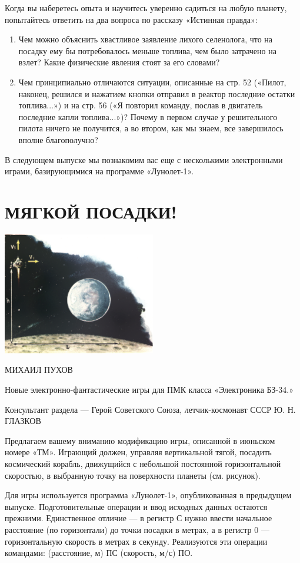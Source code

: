 \documentclass[11pt,a4paper,oneside]{article}
\begin{document}
Когда вы наберетесь опыта и научитесь уверенно садиться на любую планету, попытайтесь ответить на два вопроса по рассказу «Истинная правда»:
\begin{enumerate}
\item Чем можно объяснить хвастливое заявление лихого селенолога, что на посадку ему бы потребовалось меньше топлива, чем было затрачено на взлет? Какие физические явления стоят за его словами?
\item Чем принципиально отличаются ситуации, описанные на стр. 52 («Пилот, наконец, решился и нажатием кнопки отправил в реактор последние остатки топлива...») и на стр. 56 («Я повторил команду, послав в двигатель последние капли топлива...»)? Почему в первом случае у решительного пилота ничего не получится, а во втором, как мы знаем, все завершилось вполне благополучно?
\end{enumerate}

В следующем выпуске мы познакомим вас еще с несколькими электронными играми, базирующимися на программе «Лунолет-1».

\section{МЯГКОЙ ПОСАДКИ!}

\includegraphics[width=0.5\textwidth]{soft_land1}

МИХАИЛ ПУХОВ

Новые электронно-фантастические игры для ПМК класса «Электроника БЗ-34.»

Консультант раздела — Герой Советского Союза, летчик-космонавт СССР Ю. Н. ГЛАЗКОВ

Предлагаем вашему вниманию модификацию игры, описанной в июньском номере «ТМ». Играющий должен, управляя вертикальной тягой, посадить космический корабль, движущийся с небольшой постоянной горизонтальной скоростью, в выбранную точку на поверхности планеты (см. рисунок).

Для игры используется программа «Лунолет-1», опубликованная в предыдущем выпуске. Подготовительные операции и ввод исходных данных остаются прежними. Единственное отличие — в регистр С нужно ввести начальное расстояние (по горизонтали) до точки посадки в метрах, а в регистр 0 — горизонтальную скорость в метрах в секунду. Реализуются эти операции командами: (расстояние, м) ПС (скорость, м/с) ПО.
\end{document}

